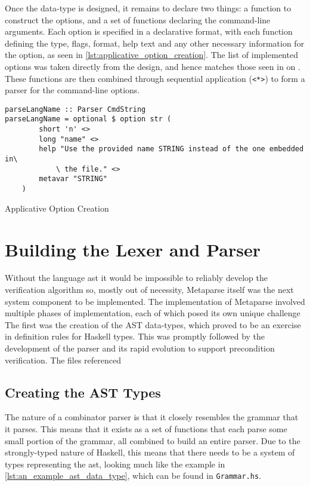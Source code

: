 Once the data-type is designed, it remains to declare two things: a function to construct the options, and a set of functions declaring the command-line arguments.
Each option is specified in a declarative format, with each function defining the type, flags, format, help text and any other necessary information for the option, as seen in \autoref{lst:applicative_option_creation}.
The list of implemented options was taken directly from the design, and hence matches those seen in  on .
These functions are then combined through sequential application (\texttt{<*>}) to form a parser for the command-line options.

\begin{listing}[!htb]
\begin{verbatim}
parseLangName :: Parser CmdString
parseLangName = optional $ option str (
        short 'n' <>
        long "name" <>
        help "Use the provided name STRING instead of the one embedded in\
            \ the file." <>
        metavar "STRING"
    )
\end{verbatim}
\caption{Applicative Option Creation}
\label{lst:applicative_option_creation}
\end{listing}



\section{Building the Lexer and Parser} %
\label{sec:building_the_lexer_and_parser}
Without the language \gls{ast} it would be impossible to reliably develop the verification algorithm so, mostly out of necessity, Metaparse itself was the next system component to be implemented. 
The implementation of Metaparse involved multiple phases of implementation, each of which posed its own unique challenge
The first was the creation of the AST data-types, which proved to be an exercise in definition rules for Haskell types.
This was promptly followed by the development of the parser and its rapid evolution to support precondition verification.
The files referenced 

\subsection{Creating the AST Types} %
\label{sub:creating_the_ast_types}
The nature of a combinator parser is that it closely resembles the grammar that it parses. 
This means that it exists as a set of functions that each parse some small portion of the grammar, all combined to build an entire parser. 
Due to the strongly-typed nature of Haskell, this means that there needs to be a system of types representing the \gls{ast}, looking much like the example in \autoref{lst:an_example_ast_data_type}, which can be found in \texttt{Grammar.hs}.\\

